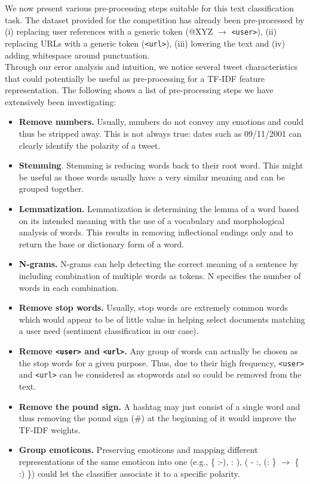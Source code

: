 We now present various pre-processing steps suitable for this text classification task.
The dataset provided for the competition has already been pre-processed by (i) replacing user references with a generic token (@XYZ $\rightarrow$ \texttt{<user>}), (ii) replacing URLs with a generic token (\texttt{<url>}), (iii) lowering the text and (iv) adding whitespace around punctuation.\\
Through our error analysis and intuition, we notice several tweet characteristics that could potentially be useful as pre-processing for a TF-IDF feature representation.
The following shows a list of pre-processing steps we have extensively been investigating:
\begin{itemize}
\item \textbf{Remove numbers.} Usually, numbers do not convey any emotions and could thus be stripped away. This is not always true: dates such as 09/11/2001 can clearly identify the polarity of a tweet.
\item \textbf{Stemming}. Stemming is reducing words back to their root word. This might be useful as those words usually have a very similar meaning and can be grouped together.
\item \textbf{Lemmatization.} Lemmatization is determining the lemma of a word based on its intended meaning with the use of a vocabulary and morphological analysis of words. This results in removing inflectional endings only and to return the base or dictionary form of a word.
\item \textbf{N-grams.} N-grams can help detecting the correct meaning of a sentence by including combination of multiple words as tokens. N specifies the number of words in each combination. 
\item \textbf{Remove stop words.} Usually, stop words are extremely common words which would appear to be of little value in helping select documents matching a user need (sentiment classification in our case).
\item \textbf{Remove \texttt{<user>} and \texttt{<url>}.} Any group of words can actually be chosen as the stop words for a given purpose. Thus, due to their high frequency, \texttt{<user>} and \texttt{<url>} can be considered as stopwords and so could be removed from the text.
\item \textbf{Remove the pound sign.} A hashtag may just consist of a single word and thus removing the pound sign (\#) at the beginning of it would improve the TF-IDF weights.
\item \textbf{Group emoticons.} Preserving emoticons and mapping different representations of the same emoticon into one (e.g., \{ :-), : ), ( - :, (: \} $\rightarrow$ \{ :) \}) could let the classifier associate it to a specific polarity.

\end{itemize}

